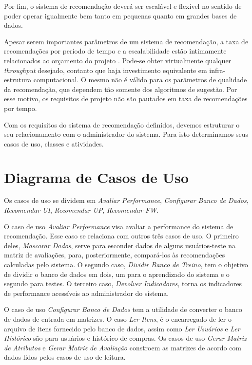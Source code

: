 Por fim, o sistema de recomendação deverá ser escalável e flexível no sentido de poder operar igualmente bem tanto em pequenas quanto em grandes bases de dados.

Apesar serem importantes parâmetros de um sistema de recomendação, a taxa de recomendações por período de tempo e a escalabilidade estão intimamente relacionados ao orçamento do projeto  \cite{sarwar2001item}. Pode-se obter virtualmente qualquer \textit{throughput} desejado, contanto que haja investimento equivalente em infra-estrutura computacional. O mesmo não é válido para os parâmetros de qualidade da recomendação, que dependem tão somente dos algoritmos de sugestão. Por esse motivo, os requisitos de projeto não são pautados em taxa de recomendações por tempo.

Com os requisitos do sistema de recomendação definidos, devemos estruturar o seu relacionamento com o administrador do sistema. Para isto determinamos seus casos de uso, classes e atividades.

\section{Diagrama de Casos de Uso} %
\label{sec:Diagrama de Casos de Uso}

Os casos de uso se dividem em \textit{Avaliar Performance}, \textit{Configurar Banco de Dados}, \textit{Recomendar UI}, \textit{Recomendar UP}, \textit{Recomendar FW}.

O caso de uso \textit{Avaliar Performance} visa avaliar a performance do sistema de recomendação. Esse caso se relaciona com outros três casos de uso. O primeiro deles, \textit{Mascarar Dados}, serve para esconder dados de alguns usuários-teste na matriz de avaliações, para, posteriormente, compará-los às recomendações calculadas pelo sistema. O segundo caso, \textit{Dividir Banco de Treino}, tem o objetivo de dividir o banco de dados em dois, um para o aprendizado do sistema e o segundo para testes. O terceiro caso, \textit{Devolver Indicadores}, torna os indicadores de performance acessíveis ao administrador do sistema.

O caso de uso \textit{Configurar Banco de Dados} tem a utilidade de converter o banco de dados de entrada em matrizes. O caso \textit{Ler Itens}, é o encarregado de ler o arquivo de itens fornecido pelo banco de dados, assim como \textit{Ler Usuários} e \textit{Ler Histórico} são para usuários e histórico de compras. Os casos de uso \textit{Gerar Matriz de Atributos} e \textit{Gerar Matriz de Avaliação} constroem as matrizes de acordo com dados lidos pelos casos de uso de leitura.

